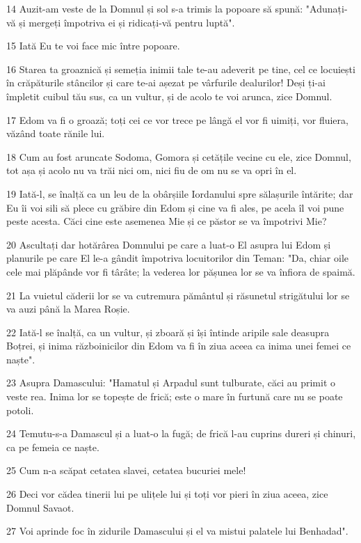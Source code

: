 \par 14 Auzit-am veste de la Domnul și sol s-a trimis la popoare să spună: "Adunați-vă și mergeți împotriva ei și ridicați-vă pentru luptă".
\par 15 Iată Eu te voi face mic între popoare.
\par 16 Starea ta groaznică și semeția inimii tale te-au adeverit pe tine, cel ce locuiești în crăpăturile stâncilor și care te-ai așezat pe vârfurile dealurilor! Deși ți-ai împletit cuibul tău sus, ca un vultur, și de acolo te voi arunca, zice Domnul.
\par 17 Edom va fi o groază; toți cei ce vor trece pe lângă el vor fi uimiți, vor fluiera, văzând toate rănile lui.
\par 18 Cum au fost aruncate Sodoma, Gomora și cetățile vecine cu ele, zice Domnul, tot așa și acolo nu va trăi nici om, nici fiu de om nu se va opri în el.
\par 19 Iată-l, se înalță ca un leu de la obârșiile Iordanului spre sălașurile întărite; dar Eu îi voi sili să plece cu grăbire din Edom și cine va fi ales, pe acela îl voi pune peste acesta. Căci cine este asemenea Mie și ce păstor se va împotrivi Mie?
\par 20 Ascultați dar hotărârea Domnului pe care a luat-o El asupra lui Edom și planurile pe care El le-a gândit împotriva locuitorilor din Teman: "Da, chiar oile cele mai plăpânde vor fi târâte; la vederea lor pășunea lor se va înfiora de spaimă.
\par 21 La vuietul căderii lor se va cutremura pământul și răsunetul strigătului lor se va auzi până la Marea Roșie.
\par 22 Iată-l se înalță, ca un vultur, și zboară și își întinde aripile sale deasupra Boțrei, și inima războinicilor din Edom va fi în ziua aceea ca inima unei femei ce naște".
\par 23 Asupra Damascului: "Hamatul și Arpadul sunt tulburate, căci au primit o veste rea. Inima lor se topește de frică; este o mare în furtună care nu se poate potoli.
\par 24 Temutu-s-a Damascul și a luat-o la fugă; de frică l-au cuprins dureri și chinuri, ca pe femeia ce naște.
\par 25 Cum n-a scăpat cetatea slavei, cetatea bucuriei mele!
\par 26 Deci vor cădea tinerii lui pe ulițele lui și toți vor pieri în ziua aceea, zice Domnul Savaot.
\par 27 Voi aprinde foc în zidurile Damascului și el va mistui palatele lui Benhadad".
